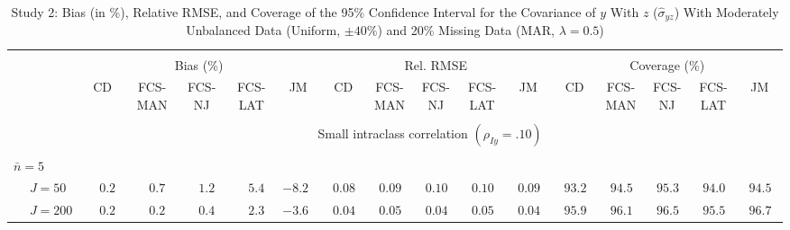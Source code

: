 \begin{sidewaystable}
\begin{threeparttable}
\setlength{\tabcolsep}{1.0pt}
\renewcommand{\arraystretch}{0.95}
\footnotesize
\caption{\small Study 2: Bias (in \%), Relative RMSE, and Coverage of the 95\% Confidence Interval for the Covariance of $y$ With $z$ ($\hat\sigma_{yz}$) With Moderately Unbalanced Data (Uniform, $\pm 40\%$) and 20\% Missing Data (MAR, $\lambda=0.5$)}
\begin{tabular}{llccccccccccccccc}
\hline\\[-1.8ex]
& & \multicolumn{5}{c}{Bias (\%)} & \multicolumn{5}{c}{Rel. RMSE} & \multicolumn{5}{c}{Coverage (\%)} \\ \cmidrule(r){3-7}\cmidrule(r){8-12}\cmidrule(r){13-17}
 &  & CD & \makecell{FCS-\\MAN} & \makecell{FCS-\\NJ} & \makecell{FCS-\\LAT} & JM & CD & \makecell{FCS-\\MAN} & \makecell{FCS-\\NJ} & \makecell{FCS-\\LAT} & JM & CD & \makecell{FCS-\\MAN} & \makecell{FCS-\\NJ} & \makecell{FCS-\\LAT} & \multicolumn{1}{c}{JM} \\ 
[0.4ex]\hline\\[-1.8ex]
& & \multicolumn{15}{c}{Small intraclass correlation $(\rho_{Iy}=.10)$} \\[0.6ex]\hline\\[-1.8ex]
\multicolumn{4}{l}{$\bar{n}=5$} \\  & \nopagebreak $\;J=50$  & $\phantom{-}0.2\phantom{0}$ & $\phantom{-}0.7\phantom{0}$ & $\phantom{-}1.2\phantom{0}$ & $\phantom{-}5.4\phantom{0}$ & ${-}8.2\phantom{0}$ & $\phantom{0}0.08\phantom{0}$ & $\phantom{0}0.09\phantom{0}$ & $\phantom{0}0.10\phantom{0}$ & $\phantom{0}0.10\phantom{0}$ & $\phantom{0}0.09\phantom{0}$ & $\phantom{0}93.2\phantom{0}$ & $\phantom{0}94.5\phantom{0}$ & $\phantom{0}95.3\phantom{0}$ & $\phantom{0}94.0\phantom{0}$ & $\phantom{0}94.5\phantom{0}$ \\
 & \nopagebreak $\;J=200$  & $\phantom{-}0.2\phantom{0}$ & $\phantom{-}0.2\phantom{0}$ & $\phantom{-}0.4\phantom{0}$ & $\phantom{-}2.3\phantom{0}$ & ${-}3.6\phantom{0}$ & $\phantom{0}0.04\phantom{0}$ & $\phantom{0}0.05\phantom{0}$ & $\phantom{0}0.04\phantom{0}$ & $\phantom{0}0.05\phantom{0}$ & $\phantom{0}0.04\phantom{0}$ & $\phantom{0}95.9\phantom{0}$ & $\phantom{0}96.1\phantom{0}$ & $\phantom{0}96.5\phantom{0}$ & $\phantom{0}95.5\phantom{0}$ & $\phantom{0}96.7\phantom{0}$ \\

\end{tabular}
\end{threeparttable}
\end{sidewaystable}
